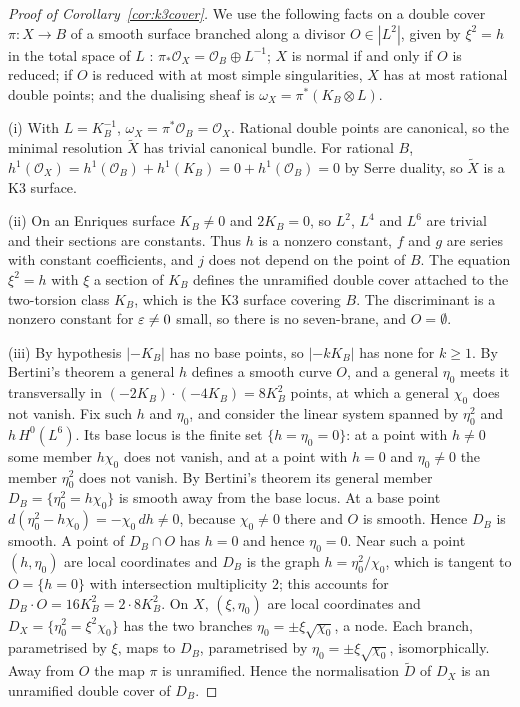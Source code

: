\begin{proof}[Proof of Corollary~\ref{cor:k3cover}]
We use the following facts on a double cover $\pi:X\to B$ of a smooth surface branched along a divisor $O\in|L^2|$, given by $\xi^2=h$ in the total space of $L$ \cite[Chapters~I and~III]{BHPV04}: $\pi_*\mathcal O_X=\mathcal O_B\oplus L^{-1}$; $X$ is normal if and only if $O$ is reduced; if $O$ is reduced with at most simple singularities, $X$ has at most rational double points; and the dualising sheaf is $\omega_X=\pi^*(K_B\otimes L)$.

(i) With $L=K_B^{-1}$, $\omega_X=\pi^*\mathcal O_B=\mathcal O_X$. Rational double points are canonical, so the minimal resolution $\widetilde X$ has trivial canonical bundle. For rational $B$, $h^1(\mathcal O_X)=h^1(\mathcal O_B)+h^1(K_B)=0+h^1(\mathcal O_B)=0$ by Serre duality, so $\widetilde X$ is a K3 surface.

(ii) On an Enriques surface $K_B\ne0$ and $2K_B=0$, so $L^2$, $L^4$ and $L^6$ are trivial and their sections are constants. Thus $h$ is a nonzero constant, $f$ and $g$ are series with constant coefficients, and $j$ does not depend on the point of $B$. The equation $\xi^2=h$ with $\xi$ a section of $K_B$ defines the unramified double cover attached to the two-torsion class $K_B$, which is the K3 surface covering $B$. The discriminant is a nonzero constant for $\varepsilon\ne0$ small, so there is no seven-brane, and $O=\emptyset$.

(iii) By hypothesis $|{-K_B}|$ has no base points, so $|{-kK_B}|$ has none for $k\ge1$. By Bertini's theorem a general $h$ defines a smooth curve $O$, and a general $\eta_0$ meets it transversally in $(-2K_B)\cdot(-4K_B)=8K_B^2$ points, at which a general $\chi_0$ does not vanish. Fix such $h$ and $\eta_0$, and consider the linear system spanned by $\eta_0^2$ and $h\,H^0(L^6)$. Its base locus is the finite set $\{h=\eta_0=0\}$: at a point with $h\ne0$ some member $h\chi_0$ does not vanish, and at a point with $h=0$ and $\eta_0\ne0$ the member $\eta_0^2$ does not vanish. By Bertini's theorem its general member $D_B=\{\eta_0^2=h\chi_0\}$ is smooth away from the base locus. At a base point $d(\eta_0^2-h\chi_0)=-\chi_0\,dh\ne0$, because $\chi_0\ne0$ there and $O$ is smooth. Hence $D_B$ is smooth. A point of $D_B\cap O$ has $h=0$ and hence $\eta_0=0$. Near such a point $(h,\eta_0)$ are local coordinates and $D_B$ is the graph $h=\eta_0^2/\chi_0$, which is tangent to $O=\{h=0\}$ with intersection multiplicity $2$; this accounts for $D_B\cdot O=16K_B^2=2\cdot8K_B^2$. On $X$, $(\xi,\eta_0)$ are local coordinates and $D_X=\{\eta_0^2=\xi^2\chi_0\}$ has the two branches $\eta_0=\pm\xi\sqrt{\chi_0}$, a node. Each branch, parametrised by $\xi$, maps to $D_B$, parametrised by $\eta_0=\pm\xi\sqrt{\chi_0}$, isomorphically. Away from $O$ the map $\pi$ is unramified. Hence the normalisation $\widetilde D$ of $D_X$ is an unramified double cover of $D_B$.


\end{proof}
